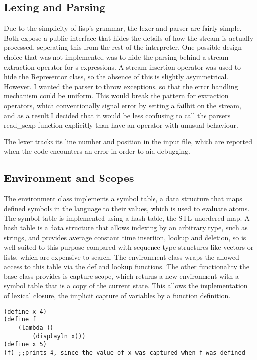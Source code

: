 \documentclass[12pt]{article}
\begin{document}
\subsection{Lexing and Parsing}
\label{section:parser}

Due to the simplicity of lisp's grammar, the lexer and parser are
fairly simple. Both expose a public interface that hides the details
of how the stream is actually processed, seperating this from the rest
of the interpreter. One possible design choice that was not
implemented was to hide the parsing behind a stream extraction
operator for s expressions. A stream insertion operator was used to
hide the Representor class, so the absence of this is slightly
asymmetrical. However, I wanted the parser to throw exceptions, so
that the error handling mechanism could be uniform. This would break
the pattern for extraction operators, which conventionally signal
error by setting a failbit on the stream, and as a result I decided
that it would be less confusing to call the parsers read\_sexp
function explicitly than have an operator with unusual behaviour.

The lexer tracks its line number and position in the input file,
which are reported when the code encounters an error in order to aid
debugging.


\subsection{Environment and Scopes}

The environment class implements a symbol table, a data structure that
maps defined symbols in the language to their values, which is used to
evaluate atoms. The symbol table is implemented using a hash table,
the STL unordered map. A hash table is a data structure that allows
indexing by an arbitrary type, such as strings, and provides average
constant time insertion, lookup and deletion, so is well suited to
this purpose compared with sequence-type structures like vectors or
lists, which are expensive to search. The environment class wraps the
allowed access to this table via the def and lookup functions. The
other functionality the base class provides is capture scope, which
returns a new environment with a symbol table that is a copy of the
current state. This allows the implementation of lexical closure, the
implicit capture of variables by a function definition.

\newpage
\begin{lstlisting}
(define x 4)
(define f
	(lambda ()
		(displayln x)))
(define x 5)
(f) ;;prints 4, since the value of x was captured when f was defined
\end{lstlisting} 
\end{document}
